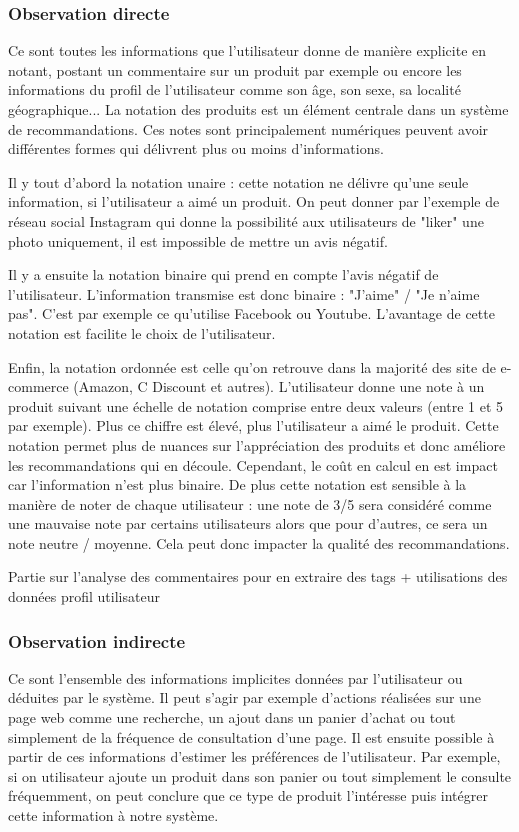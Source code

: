 \documentclass{report}
\begin{document}
\subsubsection{Observation directe}
Ce sont toutes les informations que l'utilisateur donne de manière explicite en notant, postant un commentaire sur un produit par exemple ou encore les informations du profil de l'utilisateur comme son âge, son sexe, sa localité géographique...
La notation des produits est un élément centrale dans un système de recommandations. Ces notes sont principalement numériques peuvent avoir différentes formes qui délivrent plus ou moins d'informations.
\vspace{0.5cm}
\par Il y tout d'abord la notation unaire : cette notation ne délivre qu'une seule information, si l'utilisateur a aimé un produit. On peut donner par l'exemple de réseau social Instagram qui donne la possibilité aux utilisateurs de "liker" une photo uniquement, il est impossible de mettre un avis négatif.
\par Il y a ensuite la notation binaire  qui prend en compte l'avis négatif de l'utilisateur. L'information transmise est donc binaire : "J'aime" / "Je n'aime pas". C'est par exemple ce qu'utilise Facebook ou Youtube. L'avantage de cette notation est facilite le choix de l'utilisateur.
\par Enfin, la notation ordonnée est celle qu'on retrouve dans la majorité des site de e-commerce (Amazon, C Discount et autres). L'utilisateur donne une note à un produit suivant une échelle de notation comprise entre deux valeurs (entre 1 et 5 par exemple). Plus ce chiffre est élevé, plus l'utilisateur a aimé le produit. Cette notation permet plus de nuances sur l'appréciation des produits et donc améliore les recommandations qui en découle.
Cependant, le coût en calcul en est impact car l'information n'est plus binaire. De plus cette notation est sensible à la manière de noter de chaque utilisateur : une note de 3/5 sera considéré comme une mauvaise note par certains utilisateurs alors que pour d'autres, ce sera un note neutre / moyenne. Cela peut donc impacter la qualité des recommandations.

\vspace{0.5cm}

Partie sur l'analyse des commentaires pour en extraire des tags + utilisations des données profil utilisateur
\subsubsection{Observation indirecte}
Ce sont l'ensemble des informations implicites données par l'utilisateur ou déduites par le système. Il peut s'agir par exemple d'actions réalisées sur une page web comme une recherche, un ajout dans un panier d'achat ou tout simplement de la fréquence de consultation d'une page. Il est ensuite possible à partir de ces informations d'estimer les préférences de l'utilisateur. Par exemple, si on utilisateur ajoute un produit dans son panier ou tout simplement le consulte fréquemment, on peut conclure que ce type de produit l'intéresse puis intégrer cette information à notre système.
\end{document}
